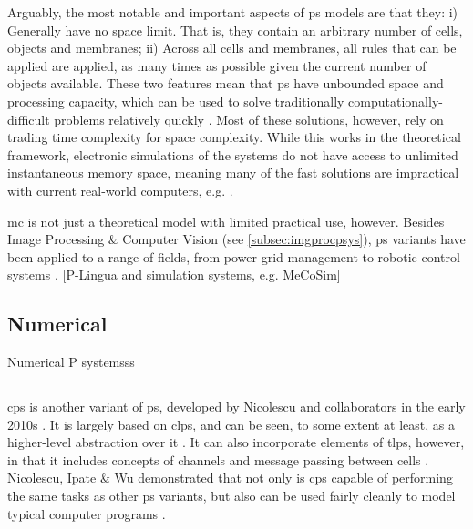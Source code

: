 Arguably, the most notable and important aspects of \gls{ps} models are that they:  i) Generally have no space limit.  That is, they contain an arbitrary number of cells, objects and membranes;  ii) Across all cells and membranes, all rules that can be applied are applied, as many times as possible given the current number of objects available.  These two features mean that \gls{ps} have unbounded space and processing capacity, which can be used to solve traditionally computationally-difficult problems relatively quickly \cite{Sosik2003,Jimenez2003,Paun1999a,Henderson2020}.  Most of these solutions, however, rely on trading time complexity for space complexity.  While this works in the theoretical framework, electronic simulations of the systems do not have access to unlimited instantaneous memory space, meaning many of the fast solutions are impractical with current real-world computers, e.g. \cite{Cooper2019} \fxnote[inline]{[refs]}.

\Gls{mc} is not just a theoretical model with limited practical use, however.  Besides Image Processing \& Computer Vision (see \autoref{subsec:imgprocpsys}), \gls{ps} variants have been applied to a range of fields, from power grid management to robotic control systems \cite{Zhang2017}.  [P-Lingua and simulation systems, e.g. MeCoSim]

\subsection{\label{subsec:numpsys}Numerical }
Numerical P systemsss

\subsection{\label{subsec:cpsys}}
\cite{Nicolescu2014b,Nicolescu2017}

\gls{cps} is another variant of \gls{ps}, developed by Nicolescu and collaborators in the early 2010s \fxerror[inline]{[ref]}.  It is largely based on \gls{clps}, and can be seen, to some extent at least, as a higher-level abstraction over it \cite{Nicolescu2018}.  It can also incorporate elements of \gls{tlps}, however, in that it includes concepts of channels and message passing between cells \cite{Henderson2019}.  Nicolescu, Ipate \& Wu demonstrated that not only is \gls{cps} capable of performing the same tasks as other \gls{ps} variants, but also can be used fairly cleanly to model typical computer programs \cite{Nicolescu2014a}.

